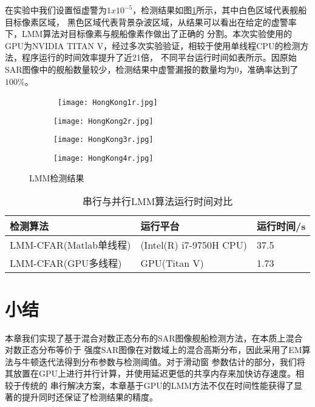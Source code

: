   在实验中我们设置恒虚警为$1x10^{-5}$，检测结果如图\ref{fig:chap2:detectresult}所示，其中白色区域代表舰船目标像素区域，
  黑色区域代表背景杂波区域，从结果可以看出在给定的虚警率下，LMM算法对目标像素与舰船像素作做出了正确的
  分割。本次实验使用的GPU为NVIDIA TITAN V，经过多次实验验证，相较于使用单线程CPU的检测方法，程序运行的时间效率提升了近21倍，
  不同平台运行时间如表所示。因原始SAR图像中的舰船数量较少，检测结果中虚警漏报的数量均为0，准确率达到了$100\%$。

  \begin{figure}[h]
    \centering%
    \begin{subfigure}{0.4\textwidth}\
      \texttt{[image: HongKong1r.jpg]}
    \end{subfigure}%
    \begin{subfigure}{0.4\textwidth}
      \texttt{[image: HongKong2r.jpg]}
    \end{subfigure}

    \begin{subfigure}{0.4\textwidth}
      \texttt{[image: HongKong3r.jpg]}
    \end{subfigure}%
    \begin{subfigure}{0.4\textwidth}
      \texttt{[image: HongKong4r.jpg]}
    \end{subfigure}   

    \caption{LMM检测结果}
    \label{fig:chap2:detectresult}
  \end{figure}

  \begin{table}[htb]
  \centering
    \begin{minipage}[t]{1\linewidth} %
    \caption[LMM算法时间]{串行与并行LMM算法运行时间对比}
    \label{tab:chap3:timeresult}
      \begin{tabularx}{\linewidth}{lXX}
        \toprule[1.5pt]
        {\heiti 检测算法} & {\heiti 运行平台} & {\heiti 运行时间/s} \\ \midrule[1pt]
        LMM-CFAR(Matlab单线程) & (Intel(R) i7-9750H CPU) & 37.5 \\
        LMM-CFAR(GPU多线程) &  GPU(Titan V) & 1.73 \\
        \bottomrule[1.5pt]
      \end{tabularx}
    \end{minipage}
  \end{table}

\section{小结}
    本章我们实现了基于混合对数正态分布的SAR图像舰船检测方法，在本质上混合对数正态分布等价于
    强度SAR图像在对数域上的混合高斯分布，因此采用了EM算法与牛顿迭代法得到分布参数与检测阈值。对于滑动窗
    参数估计的部分，我们将其放置在GPU上进行并行计算，并使用延迟更低的共享内存来加快访存速度。相较于传统的
    串行解决方案，本章基于GPU的LMM方法不仅在时间性能获得了显著的提升同时还保证了检测结果的精度。



